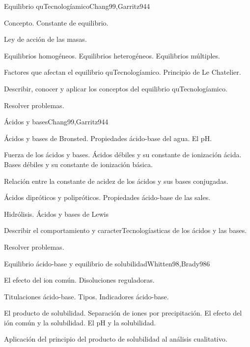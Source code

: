 \begin{syllabus}
\begin{unit}{Equilibrio quTecnologíamico}{Chang99,Garritz94}{4}
\begin{topics}
      \item Concepto. Constante de equilibrio.
      \item Ley de acción de las masas.
      \item Equilibrios homogéneos. Equilibrios heterogéneos. Equilibrios múltiples.
      \item Factores que afectan el equilibrio quTecnologíamico. Principio de Le Chatelier.
    \end{topics}
   \begin{unitgoals}
      \item Describir, conocer y aplicar los conceptos del equilibrio quTecnologíamico.
      \item Resolver problemas.
   \end{unitgoals}
\end{unit}

\begin{unit}{Ácidos y bases}{Chang99,Garritz94}{4}
\begin{topics}
	\item Ácidos y bases de Bronsted. Propiedades ácido-base del agua. El pH.
	\item Fuerza de los ácidos y bases. Ácidos débiles y su constante de ionización ácida. Bases débiles y su constante de ionización básica. 
	\item Relación entre la constante de acidez de los ácidos y sus bases conjugadas.
	\item Ácidos dipróticos y polipróticos. Propiedades ácido-base de las sales.
	\item Hidrólisis.  Ácidos y bases de Lewis
\end{topics}

\begin{unitgoals}
	\item Describir el comportamiento y caracterTecnologíasticas de los ácidos y las bases.
	\item Resolver problemas.
\end{unitgoals}
\end{unit}

\begin{unit}{Equilibrio ácido-base y equilibrio de solubilidad}{Whitten98,Brady98}{6}
\begin{topics}
	\item El efecto del ion común. Disoluciones reguladoras.
	\item Titulaciones ácido-base. Tipos.  Indicadores ácido-base.
	\item El producto de solubilidad. Separación de iones por precipitación. El efecto del ión común y la solubilidad. El pH y la solubilidad.
	\item Aplicación del principio del producto de solubilidad al análisis cualitativo.
\end{topics}


\end{unit}
\end{syllabus}
